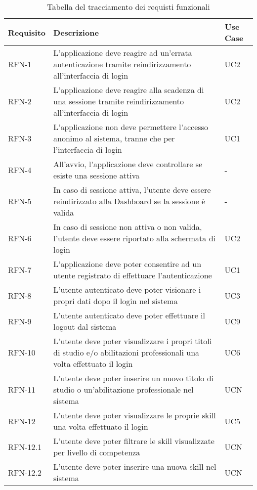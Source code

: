 \begin{table}%
\caption{Tabella del tracciamento dei requisti funzionali}
\label{tab:requisiti-funzionali}
\begin{tabularx}{\textwidth}{lXl}
\hline\hline
\textbf{Requisito} & \textbf{Descrizione} & \textbf{Use Case}\\
\hline
RFN-1 & L'applicazione deve reagire ad un'errata autenticazione tramite reindirizzamento all'interfaccia di login & UC2 \\
\hline
RFN-2 & L'applicazione deve reagire alla scadenza di una sessione tramite reindirizzamento all'interfaccia di login & UC2 \\
\hline
RFN-3 & L'applicazione non deve permettere l'accesso anonimo al sistema, tranne che per l'interfaccia di login & UC1 \\
\hline
RFN-4 & All'avvio, l'applicazione deve controllare se esiste una sessione attiva & - \\
\hline
RFN-5 & In caso di sessione attiva, l'utente deve essere reindirizzato alla Dashboard se la sessione è valida & - \\
\hline
RFN-6 & In caso di sessione non attiva o non valida, l'utente deve essere riportato alla schermata di login & UC2 \\
\hline
RFN-7 & L'applicazione deve poter consentire ad un utente registrato di effettuare l'autenticazione & UC1 \\
\hline
RFN-8 & L'utente autenticato deve poter visionare i propri dati dopo il login nel sistema & UC3 \\
\hline
RFN-9 & L'utente autenticato deve poter effettuare il logout dal sistema & UC9 \\
\hline
RFN-10 & L'utente deve poter visualizzare i propri titoli di studio e/o abilitazioni professionali una volta effettuato il login & UC6 \\
\hline
RFN-11 & L'utente deve poter inserire un nuovo titolo di studio o un'abilitazione professionale nel sistema & UCN \\
\hline
RFN-12 & L'utente deve poter visualizzare le proprie skill una volta effettuato il login & UC5 \\
\hline
RFN-12.1 & L'utente deve poter filtrare le skill visualizzate per livello di competenza & UCN \\
\hline
RFN-12.2 & L'utente deve poter inserire una nuova skill nel sistema & UCN \\

\end{tabularx}
\end{table}
